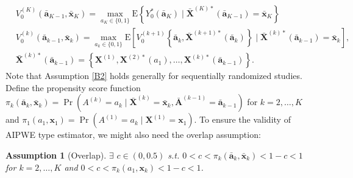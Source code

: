 \documentclass[11pt]{article}
\theoremstyle{referenceplain}
\newtheorem{assumption}{Assumption}
\theoremstyle{referencedefinition}
\theoremstyle{referenceremark}
\begin{document}
$$
\begin{aligned}
& V_0^{(K)}\left(\bar{\mathbf{a}}_{K-1}, \bar{\mathbf{x}}_K\right)=\max _{a_K \in\{0,1\}} \mathrm{E}\left\{Y_0^*\left(\bar{\mathbf{a}}_K\right) \mid \bar{\mathbf{X}}^{(K) *}\left(\bar{\mathbf{a}}_{K-1}\right)=\bar{\mathbf{x}}_K\right\} \\
& V_0^{(k)}\left(\bar{\mathbf{a}}_{k-1}, \bar{\mathbf{x}}_k\right)=\max _{a_k \in\{0,1\}} \mathrm{E}\left[V_0^{(k+1)}\left\{\bar{\mathbf{a}}_k, \bar{\mathbf{X}}^{(k+1) *}\left(\bar{\mathbf{a}}_k\right)\right\} \mid \bar{\mathbf{X}}^{(k) *}\left(\bar{\mathbf{a}}_{k-1}\right)=\bar{\mathbf{x}}_k\right], \\
& \bar{\mathbf{X}}^{(k) *}\left(\bar{\mathbf{a}}_{k-1}\right)=\left\{\mathbf{X}^{(1)}, \mathbf{X}^{(2) *}\left(a_1\right), \ldots, \mathbf{X}^{(k) *}\left(\bar{\mathbf{a}}_{k-1}\right)\right\}.
\end{aligned}
$$
Note that Assumption \ref{B2} holds generally for sequentially randomized studies. Define the propensity score function $\pi_k\left(\bar{\mathbf{a}}_k, \bar{\mathbf{x}}_k\right)=\operatorname{Pr}\left(A^{(k)}=a_k \mid \bar{\mathbf{X}}^{(k)}=\bar{\mathbf{x}}_k, \bar{\mathbf{A}}^{(k-1)}=\bar{\mathbf{a}}_{k-1}\right)$ for $k=2, \ldots, K$ and $\pi_1\left(a_1, \mathbf{x}_1\right)=\operatorname{Pr}\left(A^{(1)}=a_k \mid \mathbf{X}^{(1)}=\mathbf{x}_1\right)$. To ensure the validity of AIPWE type estimator, we might also need the overlap assumption:
\begin{assumption}[Overlap]\label{B3}
    $\exists$ $c\in(0,0.5)$ s.t. $0<c<\pi_k\left(\bar{\mathbf{a}}_k, \bar{\mathbf{x}}_k\right)<1-c<1$ for $k=2,\dots,K$ and $0<c<\pi_k\left(a_1, \mathbf{x}_k\right)<1-c<1$.
\end{assumption}
\end{document}
